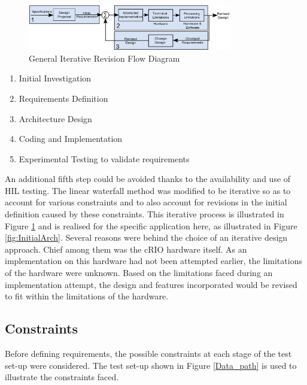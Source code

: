 \documentclass[conference]{IEEEtran}
\begin{document}
\begin{figure}[htb]
\centering
\includegraphics[width=3.5in]{RevisionFlow.png} 
\vspace{-0.5em}
\caption{General Iterative Revision Flow Diagram}
\label{fig:RevisionFlow}
\end{figure}

\begin{enumerate}
\item Initial Investigation
\item Requirements Definition
\item Architecture Design
\item Coding and Implementation
\item Experimental Testing to validate requirements
\end{enumerate}

An additional fifth step could be avoided thanks to the availability and use of HIL testing. The linear waterfall method was modified to be iterative so as to account for various constraints and to also account for revisions in the initial definition caused by these constraints. This iterative process is illustrated in Figure \ref{fig:RevisionFlow} and is realised for the specific application here, as illustrated in Figure \ref{fig:InitialArch}. Several reasons were behind the choice of an iterative design approach. Chief among them was the cRIO hardware itself. As an implementation on this hardware had not been attempted earlier, the limitations of the hardware were unknown. Based on the limitations faced during an implementation attempt, the design and features incorporated would be revised to fit within the limitations of the hardware. 
\subsection{Constraints}

Before defining requirements, the possible constraints at each stage of the test set-up were considered. The test set-up shown in Figure \ref{Data_path} is used to illustrate the constraints faced.
\end{document}
